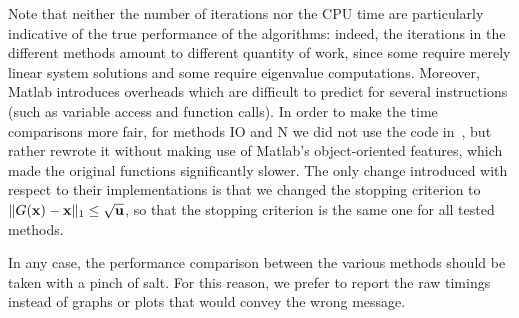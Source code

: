 \documentclass[10pt]{paper}
\DeclarePairedDelimiter{\norm}{\lVert}{\rVert}
\begin{document}
Note that neither the number of iterations nor the CPU time are particularly indicative of the true performance of the algorithms: indeed, the iterations in the different methods amount to different quantity of work, since some require merely linear system solutions and some require eigenvalue computations. Moreover, Matlab introduces overheads which are difficult to predict for several instructions (such as variable access and function calls). In order to make the time comparisons more fair, for methods IO and N we did not use the code in~\cite{mlpr_github}, but rather rewrote it without making use of Matlab's object-oriented features, which made the original functions significantly slower. The only change introduced with respect to their implementations is that we changed the stopping criterion to $\norm{G({\mathbf{x}})-{\mathbf{x}}}_1 \leq \sqrt{\mathbf{u}}$, so that the stopping criterion is the same one for all tested methods.

In any case, the performance comparison between the various methods should be taken with a pinch of salt. For this reason, we prefer to report the raw timings instead of graphs or plots that would convey the wrong message.
\end{document}
